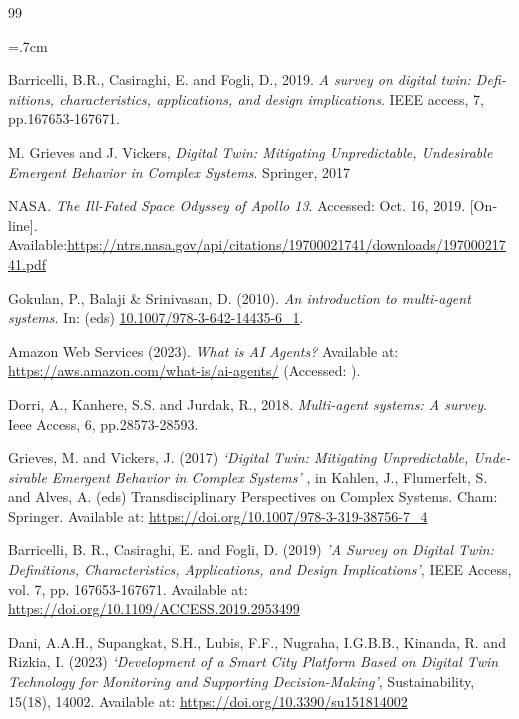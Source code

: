 \renewcommand{\bibname}{مراجع}

\begin{thebibliography}{99}

\begin{latin}

\baselineskip=.7cm

%


Barricelli, B.R., Casiraghi, E. and Fogli, D., 2019. \textit{A survey on digital twin: Definitions, characteristics, applications, and design implications}. IEEE access, 7, pp.167653-167671.

M. Grieves and J. Vickers, \textit{Digital Twin: Mitigating Unpredictable,
	Undesirable Emergent Behavior in Complex Systems}. Springer, 2017

NASA. \textit{The Ill-Fated Space Odyssey of Apollo 13}. Accessed:
Oct. 16, 2019. [Online]. Available:\url{https://ntrs.nasa.gov/api/citations/19700021741/downloads/19700021741.pdf}

Gokulan, P., Balaji \& Srinivasan, D. (2010). \textit{An introduction to multi-agent systems}. In: (eds) \url{10.1007/978-3-642-14435-6_1}.

\date{}

Amazon Web Services (2023). \textit{What is AI Agents?} Available at: \url{https://aws.amazon.com/what-is/ai-agents/} (Accessed: ).

Dorri, A., Kanhere, S.S. and Jurdak, R., 2018. \textit{Multi-agent systems: A survey}. Ieee Access, 6, pp.28573-28593.

Grieves, M. and Vickers, J. (2017) 
\textit{‘Digital Twin: Mitigating Unpredictable, Undesirable Emergent Behavior in Complex Systems’}
, in Kahlen, J., Flumerfelt, S. and Alves, A. (eds) Transdisciplinary Perspectives on Complex Systems. Cham: Springer. Available at: \url{https://doi.org/10.1007/978-3-319-38756-7_4} 

Barricelli, B. R., Casiraghi, E. and Fogli, D. (2019) \textit{'A Survey on Digital Twin: Definitions, Characteristics, Applications, and Design Implications'}, IEEE Access, vol. 7, pp. 167653-167671. Available at: \url{https://doi.org/10.1109/ACCESS.2019.2953499}

Dani, A.A.H., Supangkat, S.H., Lubis, F.F., Nugraha, I.G.B.B., Kinanda, R. and Rizkia, I. (2023) \textit{‘Development of a Smart City Platform Based on Digital Twin Technology for Monitoring and Supporting Decision-Making’}, Sustainability, 15(18), 14002. Available at: \url{https://doi.org/10.3390/su151814002}


\end{latin}
\end{thebibliography}
